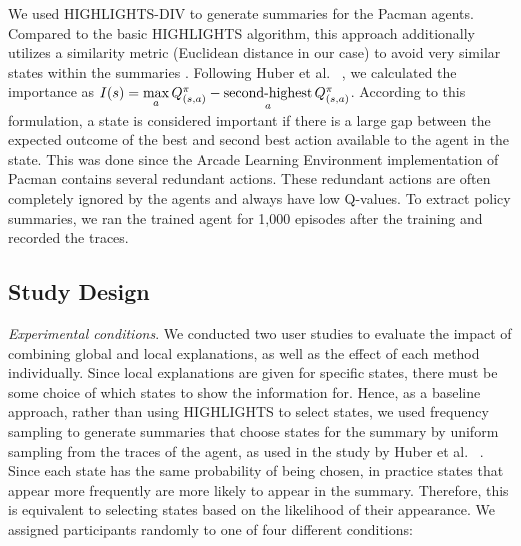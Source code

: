 \documentclass[runningheads]{llncs}
\newcommand{\shortcite}[1]{\cite{#1}}
\begin{document}
We used HIGHLIGHTS-DIV to generate summaries for the Pacman agents. 
Compared to the basic HIGHLIGHTS algorithm, this approach additionally utilizes a similarity metric (Euclidean distance in our case) to avoid very similar states within the summaries \cite{amir2018highlights}.
Following Huber et al. ~\shortcite{huber2020local}, we calculated the importance as $I(s) = \max\limits_{a}Q^{\pi}_{(s,a)}- \operatornamewithlimits{second-highest}\limits_{a}Q^{\pi}_{(s,a)}$.
According to this formulation, a state is considered important if there is a large gap between the expected outcome of the best and second best action available to the agent in the state.
This was done since the Arcade Learning Environment implementation of Pacman contains several redundant actions. 
These redundant actions are often completely ignored by the agents and always have low Q-values.
To extract policy summaries, we ran the trained agent for 1,000 episodes after the training and recorded the traces.


\subsection{Study Design}
\emph{Experimental conditions}. We conducted two user studies to evaluate the impact of combining global and local explanations, as well as the effect of each method individually. Since local explanations are given for specific states, there must be some choice of which states to show the information for. Hence, as a baseline  approach, rather than using HIGHLIGHTS to select states, we used frequency sampling to generate summaries that choose states for the summary by uniform sampling from the traces of the agent, as used in the study by Huber et al. ~\cite{huber2020local}. Since each state has the same probability of being chosen, in practice states that appear more frequently are more likely to appear in the summary.
Therefore, this is equivalent to selecting states based on the likelihood of their appearance.
We assigned participants randomly to one of four different conditions:
\end{document}
